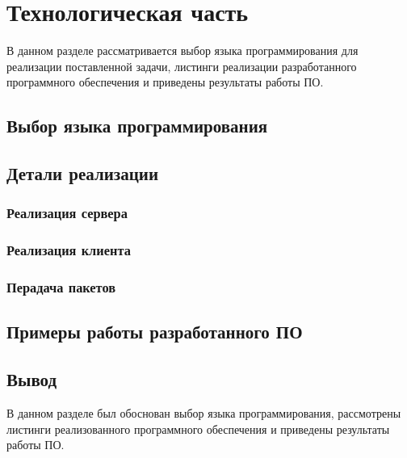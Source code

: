 \chapter{Технологическая часть}

В данном разделе рассматривается выбор языка программирования для реализации поставленной задачи, листинги реализации разработанного программного обеспечения и приведены результаты работы ПО.

\section{Выбор языка программирования}


\section{Детали реализации}

\subsection{Реализация сервера}

\subsection{Реализация клиента}

\subsection{Перадача пакетов}

\section{Примеры работы разработанного ПО}

\section*{Вывод}

В данном разделе был обоснован выбор языка программирования, рассмотрены листинги реализованного программного обеспечения и приведены результаты работы ПО.